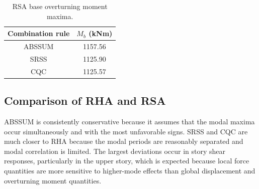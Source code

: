 \documentclass[11pt,a4paper]{article}
\begin{document}
\begin{table}[H]
\centering
\caption{RSA base overturning moment maxima.}
\begin{tabular}{cc}
\toprule
Combination rule & $M_b$ (kNm)\\
\midrule
ABSSUM & 1157.56\\
SRSS & 1125.90\\
CQC & 1125.57\\
\bottomrule
\end{tabular}
\label{tab:q4b_moment}
\end{table}

\subsection{Comparison of RHA and RSA}

\begin{table}[H]
\centering
\caption{Comparison of RHA and RSA response quantities.}
\label{tab:q4c_comparison}
\end{table}

ABSSUM is consistently conservative because it assumes that the modal maxima occur simultaneously and with the most unfavorable signs. SRSS and CQC are much closer to RHA because the modal periods are reasonably separated and modal correlation is limited. The largest deviations occur in story shear responses, particularly in the upper story, which is expected because local force quantities are more sensitive to higher-mode effects than global displacement and overturning moment quantities.
\end{document}
